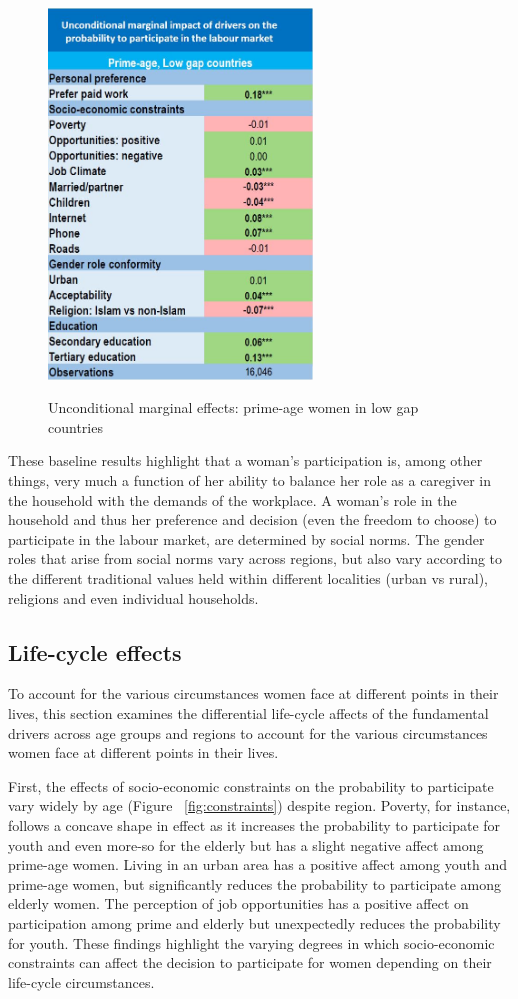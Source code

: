 \begin{figure}[htb]
	\centering
	\caption{Unconditional marginal effects: prime-age women in low gap countries}
	
	\includegraphics[width=70mm,keepaspectratio,height=0.6\textheight]{Figures/uncond_margins}
	\label{table:unconditional_marginal_effects}
\end{figure}

These baseline results highlight that a woman's participation is, among other things, very much a function of her ability to balance her role as a caregiver in the household with the demands of the workplace. A woman's role in the household and thus her preference and decision (even the freedom to choose) to participate in the labour market, are determined by social norms. The gender roles that arise from social norms vary across regions, but also vary according to the different traditional values held within different localities (urban vs rural), religions and even individual households.  

\subsection{Life-cycle effects}
To account for the various circumstances women face at different points in their lives, this section examines the differential life-cycle affects of the fundamental drivers across age groups and regions to account for the various circumstances women face at different points in their lives. 

First, the effects of socio-economic constraints on the probability to participate vary widely by age (Figure ~\ref{fig:constraints}) despite region. Poverty, for instance, follows a concave shape in effect as it increases the probability to participate for youth and even more-so for the elderly but has a slight negative affect among prime-age women. Living in an urban area has a positive affect among youth and prime-age women, but significantly reduces the probability to participate among elderly women. The perception of job opportunities has a positive affect on participation among prime and elderly but unexpectedly reduces the probability for youth. These findings highlight the varying degrees in which socio-economic constraints can affect the decision to participate for women depending on their life-cycle circumstances. 

